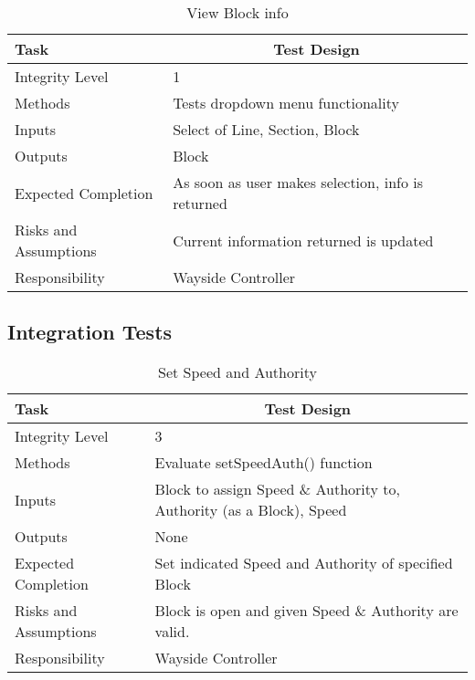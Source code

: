 \documentclass[]{article}
\begin{document}
\begin{table}[H]
	\centering
	\caption{View Block info}
	\begin{tabular}{|l|l|}
		\hline
		Task & \multicolumn{1}{c|}{Test Design} \\ \hline
		Integrity Level & 1 \\ \hline
		Methods & Tests dropdown menu functionality\\ \hline
		Inputs &  Select of Line, Section, Block \\ \hline
		Outputs &  Block\\ \hline
		Expected Completion & As soon as user makes selection, info is returned\\ \hline
		Risks and Assumptions & \parbox[t]{10cm}{Current information returned is updated} \\ \hline
		Responsibility & Wayside Controller\\ \hline
	\end{tabular}
\end{table}

\subsection{Integration Tests}
	\begin{table}[H]
		\centering
		\caption{Set Speed and Authority}
		\begin{tabular}{|l|l|}
			\hline
			Task & \multicolumn{1}{c|}{Test Design} \\ \hline
			Integrity Level & 3 \\ \hline
			Methods & Evaluate setSpeedAuth() function\\ \hline
			Inputs &  \parbox[t]{10cm}{Block to assign Speed \& Authority to, Authority (as a Block), Speed} \\ \hline
			Outputs & None\\ \hline
			Expected Completion & Set indicated Speed and Authority of specified Block \\ \hline
			Risks and Assumptions & \parbox[t]{10cm}{Block is open and given Speed \& Authority are valid.} \\ \hline
			Responsibility & Wayside Controller\\ \hline
		\end{tabular}
	\end{table}
	
\end{document}
